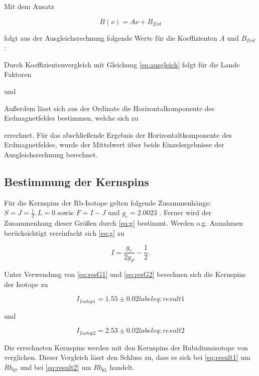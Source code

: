 Mit dem Ansatz

\begin{equation}
B(\nu) = A\nu + B_{Erd}
\end{equation}

folgt aus der Ausgleichsrechnung folgende Werte für die Koeffizienten $A$ und $B_{Erd}$:



Durch Koeffizientenvergleich mit Gleichung \ref{eq:ausgleich} folgt für die Lande Faktoren



und



Außerdem lässt sich aus der Ordinate die Horizontalkomponente des Erdmagnetfeldes bestimmen,
welche sich zu



errechnet. Für das abschließende Ergebnis der Horizontaltkomponente des Erdmagnetfeldes, wurde der Mittelwert über beide Einzelergebnisse der Ausgleichsrechnung berechnet.

\subsection{Bestimmung der Kernspins}
Für die Kernspins der Rb-Isotope gelten folgende Zusammenhänge: $S = J = \frac{1}{2} , L = 0$ sowie $F = I - J$ und $g_e = 2.0023$ \cite{landeE-}. Ferner wird
der Zusammenhang dieser Größen durch \ref{eq:g} bestimmt. Werden o.g. Annahmen berücksichtigt vereinfacht sich \ref{eq:g} zu

\begin{equation}
I = \frac{g_e}{2g_F} - \frac{1}{2}.
\end{equation}

Unter Verwendung von \ref{eq:resG1} und \ref{eq:resG2} berechnen sich die Kernspins der Isotope zu

\begin{equation}
I_{Isotop1} = 1.55 \pm 0.02 
label{eq:result1}
\end{equation}

und

\begin{equation}
I_{Isotop2} = 2.53 \pm 0.02
label{eq:result2}
\end{equation}

Die errechneten Kernspins werden mit den Kernspins der Rubidiumisotope von \cite{coreSpin} verglichen. Dieser Vergleich lässt den Schluss zu,
dass es sich bei \ref{eq:result1} um $Rb_{87}$ und bei \ref{eq:result2} um $Rb_{85}$ handelt.

